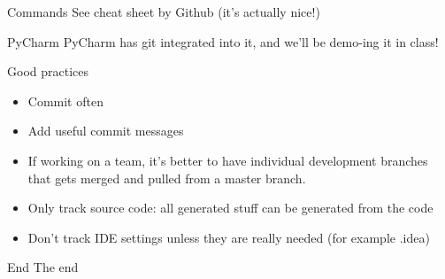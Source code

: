 \begin{frame}{Commands}
    See cheat sheet by Github (it's actually nice!)
\end{frame}

\begin{frame}{PyCharm}
    PyCharm has git integrated into it, and we'll be demo-ing it in class!
\end{frame}

\begin{frame}{Good practices}
    \begin{itemize}
        \item Commit often
        \item Add useful commit messages
        \item If working on a team, it's better to have individual development branches that gets merged and pulled from a master branch.
        \item Only track source code: all generated stuff can be generated from the code
        \item Don't track IDE settings unless they are really needed (for example .idea)
    \end{itemize}
\end{frame}

\begin{frame}[standout]{End}
  The end
\end{frame}


